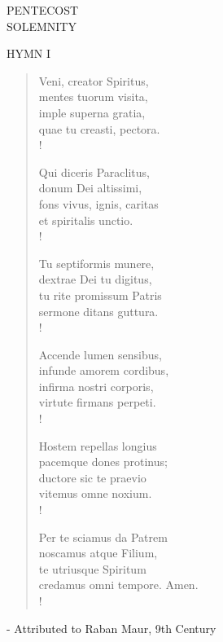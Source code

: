 \begin{center}\normalsize PENTECOST\\
\footnotesize SOLEMNITY\\
\end{center}

\noindent\small{\uppercase{Hymn I}}\normalsize\label{pentecost:firstHymn}
\begin{verse}
Veni, creator Spiritus,\\
mentes tuorum visita,\\
imple superna gratia,\\
quae tu creasti, pectora.\\!

Qui diceris Paraclitus,\\
donum Dei altissimi,\\
fons vivus, ignis, caritas\\
et spiritalis unctio.\\!

Tu septiformis munere,\\
dextrae Dei tu digitus,\\
tu rite promissum Patris\\
sermone ditans guttura.\\!

Accende lumen sensibus,\\
infunde amorem cordibus,\\
infirma nostri corporis,\\
virtute firmans perpeti.\\!

Hostem repellas longius\\
pacemque dones protinus;\\
ductore sic te praevio\\
vitemus omne noxium.\\!

Per te sciamus da Patrem\\
noscamus atque Filium,\\
te utriusque Spiritum\\
credamus omni tempore. Amen.\\!
\end{verse}
\begin{flushright}\tiny - Attributed to Raban Maur, 9th Century\end{flushright}

